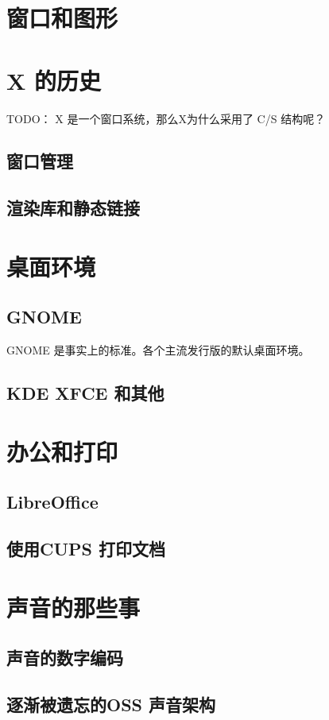 \documentclass[amstex,twoside]{ctexbook}
\begin{document}
\section{窗口和图形}

\section{X 的历史}

TODO： X 是一个窗口系统，那么X为什么采用了 C/S 结构呢？
\subsection{ 窗口管理}
\subsection{ 渲染库和静态链接}
\section{桌面环境}
\subsection{GNOME}
GNOME 是事实上的标准。各个主流发行版的默认桌面环境。
\subsection{ KDE XFCE 和其他}

\section{  办公和打印	}
\subsection{  LibreOffice	}
\subsection{使用CUPS 打印文档	}
\section{ 声音的那些事	}
\subsection{  声音的数字编码	}
\subsection{  逐渐被遗忘的OSS	声音架构}
\end{document}
